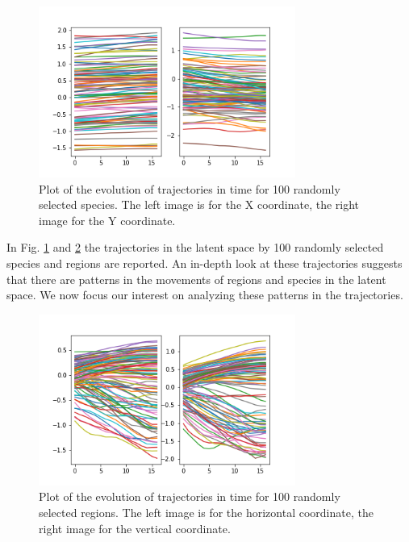 \documentclass[mscthesis]{usiinfthesis}
\begin{document}
\begin{figure}[H]
    \centering
    \includegraphics[width=0.75\textwidth]{trajectories_species.png}
    \caption{Plot of the evolution of trajectories in time for 100 randomly selected species. The left image is for the X coordinate, the right image for the Y coordinate.}
    \label{fig:trajectories_species}
\end{figure}

\noindent In Fig. \ref{fig:trajectories_species} and \ref{fig:trajectories_region} the trajectories in the latent space by 100 randomly selected species and regions are reported. An in-depth look at these trajectories suggests that there are patterns in the movements of regions and species in the latent space. We now focus our interest on analyzing these patterns in the trajectories.

\begin{figure}[ht]
    \centering
    \includegraphics[width=0.75\textwidth]{trajectories_region.png}
    \caption{Plot of the evolution of trajectories in time for 100 randomly selected regions. The left image is for the horizontal coordinate, the right image for the vertical coordinate.}
    \label{fig:trajectories_region}
\end{figure}
\end{document}
